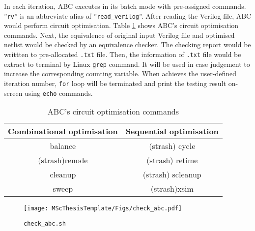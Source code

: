 In each iteration, ABC executes in its batch mode with pre-assigned commands. ''\texttt{rv}'' is an abbreviate alias of ''\texttt{read\_verilog}''. After reading the Verilog file, ABC would perform circuit optimisation. Table \ref{tab:abc commands} shows ABC's circuit optimisation commands. Next, the equivalence of original input Verilog file and optimised netlist would be checked by an equivalence checker. The checking report would be writtten to pre-allocated \texttt{.txt} file. Then, the information of \texttt{.txt} file would be extract to terminal by Linux \texttt{grep} command. It will be used in case judgement to increase the corresponding counting variable. When achieves the user-defined iteration number, \texttt{for} loop will be terminated and print the testing result on-screen using \texttt{echo} commands.
\begin{table}[htb]
    \centering
    \begin{tabular}{c|c}
    \hline
         Combinational optimisation&Sequential optimisation  \\
         \hline
         balance & (strash) cycle\\
         (strash)renode&(strash) retime\\
         cleanup&(strash) scleanup\\
         sweep&(strash)xsim\\
    \end{tabular}
    \caption{\footnotesize ABC's circuit optimisation commands}
    \label{tab:abc commands}
\end{table}

\begin{figure}[htb]
    \centering
    \texttt{[image: MScThesisTemplate/Figs/check\_abc.pdf]}
    \caption{\footnotesize\texttt{check\_abc.sh}}
    \label{fig:check_abc}
\end{figure}


